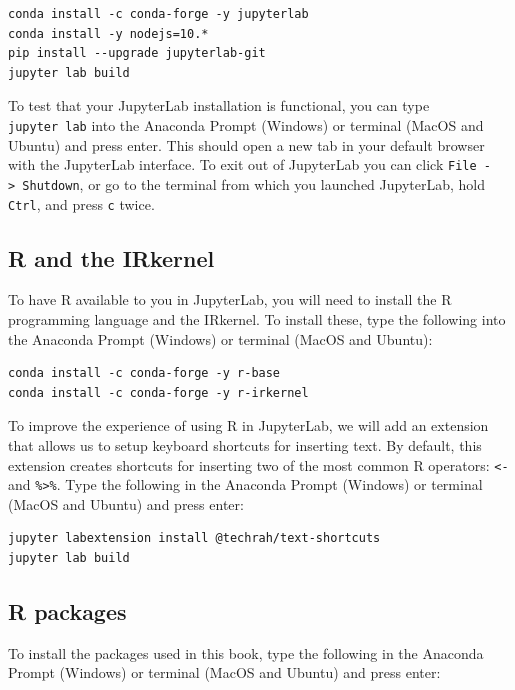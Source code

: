 \documentclass[
]{krantz}
\begin{document}
\begin{verbatim}
conda install -c conda-forge -y jupyterlab
conda install -y nodejs=10.*
pip install --upgrade jupyterlab-git
jupyter lab build
\end{verbatim}

To test that your JupyterLab installation is functional, you can type
\texttt{jupyter\ lab} into the Anaconda Prompt (Windows) or terminal (MacOS and Ubuntu) and press enter. This should open a new
tab in your default browser with the JupyterLab interface. To exit out of
JupyterLab you can click \texttt{File\ -\textgreater{}\ Shutdown}, or go to the terminal from which
you launched JupyterLab, hold \texttt{Ctrl}, and press \texttt{c} twice.

\hypertarget{r-and-the-irkernel}{%
\subsection{R and the IRkernel}\label{r-and-the-irkernel}}

To have R available to you in JupyterLab, you will need to install the R programming language and the IRkernel.
To install these, type the following into
the Anaconda Prompt (Windows) or terminal (MacOS and Ubuntu):

\begin{verbatim}
conda install -c conda-forge -y r-base
conda install -c conda-forge -y r-irkernel
\end{verbatim}

To improve the experience of using R in JupyterLab, we will add an extension
that allows us to setup keyboard shortcuts for inserting text.
By default, this extension creates shortcuts for inserting two of the most common R
operators: \texttt{\textless{}-} and \texttt{\%\textgreater{}\%}. Type the following in the Anaconda Prompt (Windows)
or terminal (MacOS and Ubuntu) and press enter:

\begin{verbatim}
jupyter labextension install @techrah/text-shortcuts
jupyter lab build
\end{verbatim}

\hypertarget{r-packages}{%
\subsection{R packages}\label{r-packages}}

To install the packages used in this book, type the following in the Anaconda Prompt (Windows) or terminal (MacOS and Ubuntu) and press enter:
\end{document}
